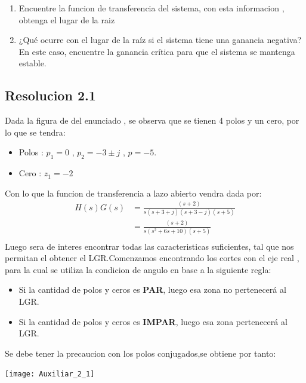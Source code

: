 \documentclass[
  11pt,
  letterpaper,
   addpoints,
   answers
  ]{exam}
\begin{document}
\begin{questions}
\begin{center}
\end{center}
    \begin{enumerate}
        \item Encuentre la funcion de transferencia del sistema, con esta informacion , obtenga el lugar de la raiz
        \item ¿Qué ocurre con el lugar de la raíz si el sistema tiene una ganancia negativa? En este caso, encuentre la ganancia crítica para que el sistema se mantenga estable.
    \end{enumerate}
\begin{solution}
\subsection*{Resolucion 2.1}
Dada la figura de del enunciado , se observa que se tienen 4 polos y un cero, por lo que se tendra:
\begin{itemize}
    \item Polos : $p_1=0$ , $p_2=-3 \pm j$ , $p=-5$.
    \item Cero : $z_1=-2$
\end{itemize}
Con lo que la funcion de transferencia a lazo abierto vendra dada por:
\begin{align}
    H(s)G(s)&=\frac{(s+2)}{s(s+3+j)(s+3-j)(s+5)}\\
     &=\frac{(s+2)}{s(s^2+6s+10)(s+5)}\\
\end{align}
Luego sera de interes encontrar todas las caracteristicas suficientes, tal que nos permitan el obtener el LGR.Comenzamos encontrando los cortes con el eje real , para la cual se utiliza la condicion de angulo en base a la siguiente regla: 
\begin{itemize}
    \item Si la cantidad de polos y ceros es \textbf{PAR}, luego esa zona no pertenecerá al LGR.
    \item Si la cantidad de polos y ceros es \textbf{IMPAR}, luego esa zona pertenecerá al LGR.
\end{itemize}
Se debe tener la precaucion con los polos conjugados,se obtiene por tanto:
\begin{center}
    \texttt{[image: Auxiliar\_2\_1]}
  \end{center}

\end{solution}
\end{questions}
\end{document}
